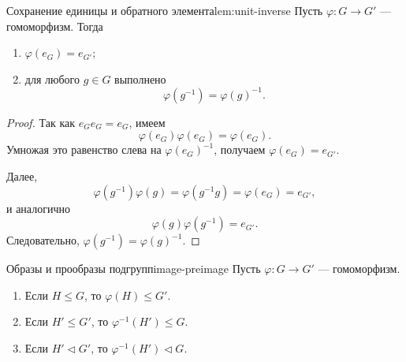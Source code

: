\begin{Lemma}{Сохранение единицы и обратного элемента}{lem:unit-inverse}
	Пусть $\varphi\colon G\to G'$ --- гомоморфизм. Тогда
	\begin{enumerate}
		\item $\varphi(e_G)=e_{G'}$;
		\item для любого $g\in G$ выполнено
		\[
		\varphi(g^{-1})=\varphi(g)^{-1}.
		\]
	\end{enumerate}
\end{Lemma}

\begin{proof}
	Так как $e_Ge_G=e_G$, имеем
	\[
	\varphi(e_G)\varphi(e_G)=\varphi(e_G).
	\]
	Умножая это равенство слева на $\varphi(e_G)^{-1}$, получаем $\varphi(e_G)=e_{G'}$.
	
	Далее,
	\[
	\varphi(g^{-1})\varphi(g)=\varphi(g^{-1}g)=\varphi(e_G)=e_{G'},
	\]
	и аналогично
	\[
	\varphi(g)\varphi(g^{-1})=e_{G'}.
	\]
	Следовательно, $\varphi(g^{-1})=\varphi(g)^{-1}$.
\end{proof}

\begin{Proposition}{Образы и прообразы подгрупп}{image-preimage}
	Пусть $\varphi\colon G\to G'$ --- гомоморфизм.
	\begin{enumerate}
		\item Если $H\le G$, то $\varphi(H)\le G'$.
		\item Если $H'\le G'$, то $\varphi^{-1}(H')\le G$.
		\item Если $H'\triangleleft G'$, то $\varphi^{-1}(H')\triangleleft G$.
	\end{enumerate}
\end{Proposition}

